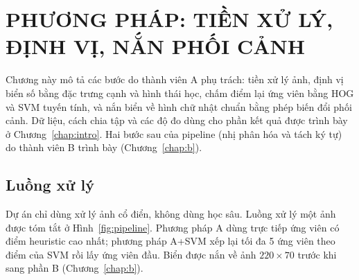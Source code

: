 \chapter{PHƯƠNG PHÁP: TIỀN XỬ LÝ, ĐỊNH VỊ, NẮN PHỐI CẢNH}
\label{chap:a-method}

Chương này mô tả các bước do thành viên A phụ trách: tiền xử lý ảnh, định vị biển số bằng đặc trưng cạnh và hình thái học, chấm điểm lại ứng viên bằng HOG và SVM tuyến tính, và nắn biển về hình chữ nhật chuẩn bằng phép biến đổi phối cảnh. Dữ liệu, cách chia tập và các độ đo dùng cho phần kết quả được trình bày ở Chương~\ref{chap:intro}. Hai bước sau của pipeline (nhị phân hóa và tách ký tự) do thành viên B trình bày (Chương~\ref{chap:b}).

\section{Luồng xử lý}
\label{sec:flow}

Dự án chỉ dùng xử lý ảnh cổ điển, không dùng học sâu. Luồng xử lý một ảnh được tóm tắt ở Hình~\ref{fig:pipeline}. Phương pháp A dùng trực tiếp ứng viên có điểm heuristic cao nhất; phương pháp A+SVM xếp lại tối đa 5 ứng viên theo điểm của SVM rồi lấy ứng viên đầu. Biển được nắn về ảnh $220\times 70$ trước khi sang phần B (Chương~\ref{chap:b}).

